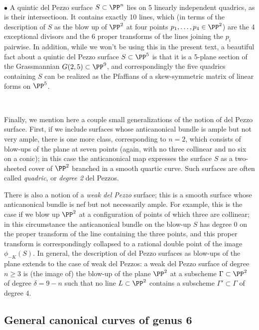 \

$\bullet$ A quintic del Pezzo surface $S \subset \PP^n$ lies on 5 linearly independent quadrics, as is their intersectioon. It contains exactly 10 lines, which (in terms of the description of $S$ as the blow up of $\PP^2$ at four points $p_1,\dots,p_4 \in \PP^2$) are the 4 exceptional divisors and the 6 proper transforms of the lines joining the $p_i$ pairwise. In addition, while we won't be using this in the present text, a beautiful fact about a  quintic del Pezzo surface $S \subset \PP^5$  is that it is a 5-plane section of the Grassmannian $G(2,5) \subset \PP^9$, and correspondingly the five quadrics containing $S$ can be realized as the Pfaffians of a  skew-symmetric matrix of linear forms on $\PP^5$.

\

Finally, we mention here a couple small generalizations of the notion of del Pezzo surface. First, if we include surfaces whose anticanonical bundle is ample but not very ample, there is one more class, corresponding to $n=2$, which consists of blow-ups of the plane at seven points (again, with no three collinear and no six on a conic); in this case the anticanonical map expresses the surface $S$ as a two-sheeted cover of $\PP^2$ branched in a smooth quartic curve. Such surfaces are often called \emph{quadric}, or \emph{degree 2} del Pezzos.


There is also a notion of a \emph{weak del Pezzo} surface; this is a smooth surface whose anticanonical bundle is nef but not necessarily ample. For example, this is the case if we blow up $\PP^2$ at a configuration of points of which three are collinear; in this circumstance the anticanonical bundle on the blow-up $S$ has degree 0 on the proper transform of the line containing the three points, and this proper transform is correspondingly collapsed to a rational double point of the image $\phi_{-K}(S)$. In general, the description of del Pezzo surfaces as blow-ups of the plane extends to the case of weak del Pezzos: a weak del Pezzo surface of degree $n \geq 3$ is (the image of) the blow-up of the plane $\PP^2$ at a subscheme $\Gamma \subset \PP^2$ of degree $\delta = 9 - n$ such that no line $L \subset \PP^2$ contains a subscheme $\Gamma' \subset \Gamma$ of degree 4.


\subsection{General canonical curves of genus 6}

